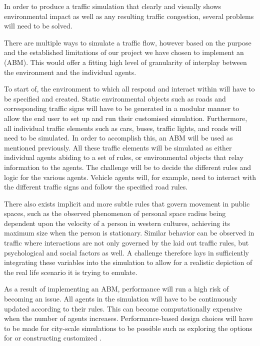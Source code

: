 In order to produce a traffic simulation that clearly and visually shows environmental impact as well as any resulting traffic congestion, several problems will need to be solved.

There are multiple ways to simulate a traffic flow, however based on the purpose and the established limitations of our project we have chosen to implement an \cite{agent-based-modeling} (ABM). This would offer a fitting high level of granularity of interplay between the environment and the individual agents. 

To start of, the environment to which all  respond and interact within will have to be specified and created. Static environmental objects such as roads and corresponding traffic signs will have to be generated in a modular manner to allow the end user to set up and run their customised simulation.
Furthermore, all individual traffic elements such as cars, buses, traffic lights, and roads will need to be simulated. In order to accomplish this, an ABM will be used as mentioned previously. All these traffic elements will be simulated as either individual agents abiding to a set of rules, or environmental objects that relay information to the agents. The challenge will be to decide the different rules and logic for the various agents. Vehicle agents will, for example, need to interact with the different traffic signs and follow the specified road rules.

There also exists implicit and more subtle rules that govern movement in public spaces, such as the observed phenomenon of personal space radius being dependent upon the velocity of a person in western cultures, achieving its maximum size when the person is stationary\cite{public-spaces}. Similar behavior can be observed in traffic where interactions are not only governed by the laid out traffic rules, but psychological and social factors as well\cite{social-interactions-av}. A challenge therefore lays in sufficiently integrating these variables into the simulation to allow for a realistic depiction of the real life scenario it is trying to emulate. 

As a result of implementing an ABM, performance will run a high risk of becoming an issue. All agents in the simulation will have to be continuously updated according to their rules. This can become computationally expensive when the number of agents increases. Performance-based design choices will have to be made for city-scale simulations to be possible such as exploring the options for  or constructing customized .

